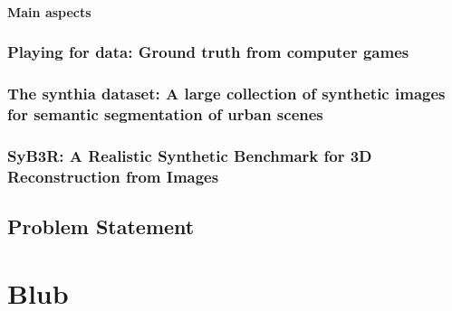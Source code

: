 \documentclass[a4paper,cleardoubleempty,BCOR1cm]{scrbook}
\begin{document}
\subsubsection{Main aspects}



\subsection{Playing for data: Ground truth from computer games}
\cite{Richter_2016_ECCV}

\subsection{The synthia dataset: A large collection of synthetic images for semantic segmentation of urban scenes}
\cite{RosCVPR16}

\subsection{SyB3R: A Realistic Synthetic Benchmark for 3D Reconstruction from Images}
\cite{syb3r2016}








\section{Problem Statement}



\appendix
\chapter{Blub}



\end{document}

